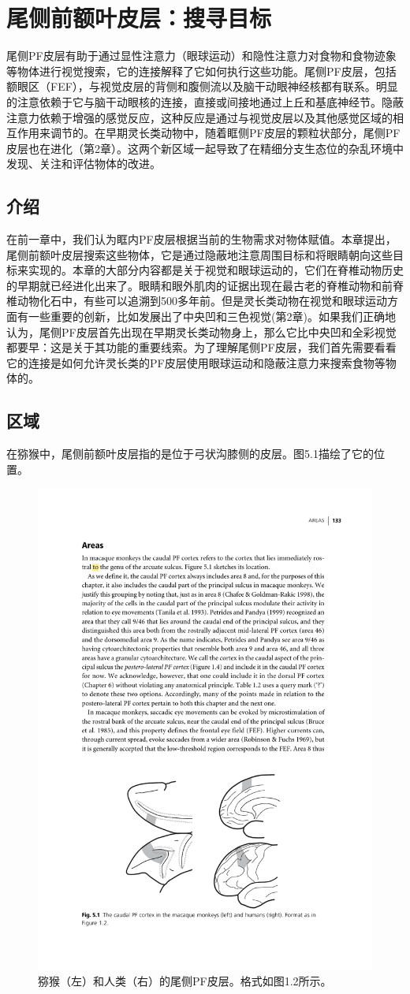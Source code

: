 \chapter{尾侧前额叶皮层：搜寻目标}
尾侧PF皮层有助于通过显性注意力（眼球运动）和隐性注意力对食物和食物迹象等物体进行视觉搜索，它的连接解释了它如何执行这些功能。尾侧PF皮层，包括额眼区（FEF），与视觉皮层的背侧和腹侧流以及脑干动眼神经核都有联系。明显的注意依赖于它与脑干动眼核的连接，直接或间接地通过上丘和基底神经节。隐蔽注意力依赖于增强的感觉反应，这种反应是通过与视觉皮层以及其他感觉区域的相互作用来调节的。在早期灵长类动物中，随着眶侧PF皮层的颗粒状部分，尾侧PF皮层也在进化（第2章）。这两个新区域一起导致了在精细分支生态位的杂乱环境中发现、关注和评估物体的改进。

\section{介绍}
在前一章中，我们认为眶内PF皮层根据当前的生物需求对物体赋值。本章提出，尾侧前额叶皮层搜索这些物体，它是通过隐蔽地注意周围目标和将眼睛朝向这些目标来实现的。本章的大部分内容都是关于视觉和眼球运动的，它们在脊椎动物历史的早期就已经进化出来了。眼睛和眼外肌肉的证据出现在最古老的脊椎动物和前脊椎动物化石中，有些可以追溯到500多年前\cite{shu2003head}。但是灵长类动物在视觉和眼球运动方面有一些重要的创新，比如发展出了中央凹和三色视觉(第2章)。如果我们正确地认为，尾侧PF皮层首先出现在早期灵长类动物身上，那么它比中央凹和全彩视觉都要早：这是关于其功能的重要线索。为了理解尾侧PF皮层，我们首先需要看看它的连接是如何允许灵长类的PF皮层使用眼球运动和隐蔽注意力来搜索食物等物体的。
\section{区域}
在猕猴中，尾侧前额叶皮层指的是位于弓状沟膝侧的皮层。图5.1描绘了它的位置。
\begin{figure}
	\centering
	\includegraphics[width=0.7\linewidth]{image_pfc/Fig_5_1}
	\caption{猕猴（左）和人类（右）的尾侧PF皮层。格式如图1.2所示。}
	\label{fig:fig}
\end{figure}

